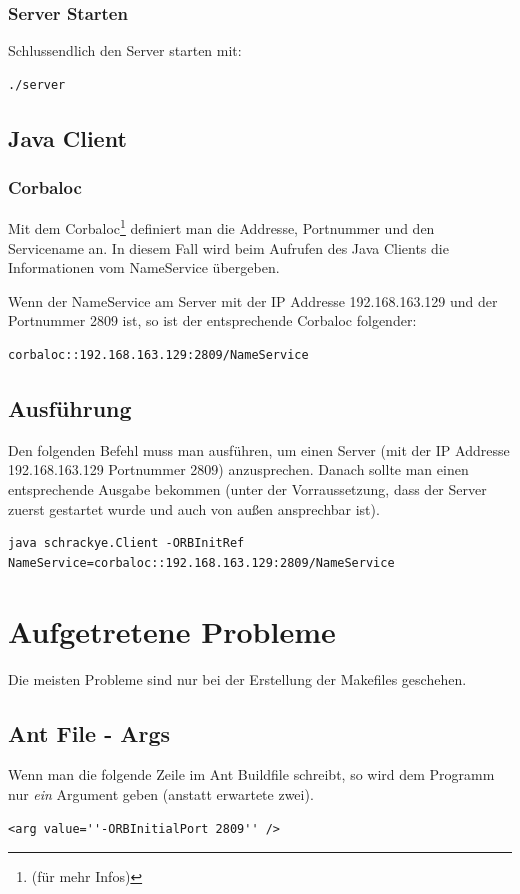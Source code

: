 \documentclass[11pt]{article}
\begin{document}
\subsubsection{Server Starten}
Schlussendlich den Server starten mit:
\begin{lstlisting}
./server
\end{lstlisting}

\subsection{Java Client}
\subsubsection{Corbaloc}
Mit dem Corbaloc\footnote{(für mehr Infos\cite{book1})} definiert man die Addresse, Portnummer und den Servicename an. In diesem Fall wird beim Aufrufen des Java Clients die Informationen vom NameService übergeben.

Wenn der NameService am Server mit der IP Addresse 192.168.163.129 und der Portnummer 2809 ist, so ist der entsprechende Corbaloc folgender:
\begin{lstlisting}
corbaloc::192.168.163.129:2809/NameService
\end{lstlisting}

\subsection{Ausführung}
Den folgenden Befehl muss man ausführen, um einen Server (mit der IP Addresse 192.168.163.129 Portnummer 2809) anzusprechen. Danach sollte man einen entsprechende Ausgabe bekommen (unter der Vorraussetzung, dass der Server zuerst gestartet wurde und auch von außen ansprechbar ist).

\begin{lstlisting}
java schrackye.Client -ORBInitRef NameService=corbaloc::192.168.163.129:2809/NameService
\end{lstlisting}

\section{Aufgetretene Probleme}
Die meisten Probleme sind nur bei der Erstellung der Makefiles geschehen.
\subsection{Ant File - Args}
Wenn man die folgende Zeile im Ant Buildfile schreibt, so wird dem Programm nur \textit{ein} Argument geben (anstatt erwartete zwei).
\begin{lstlisting}
<arg value=''-ORBInitialPort 2809'' />
\end{lstlisting}
\end{document}

